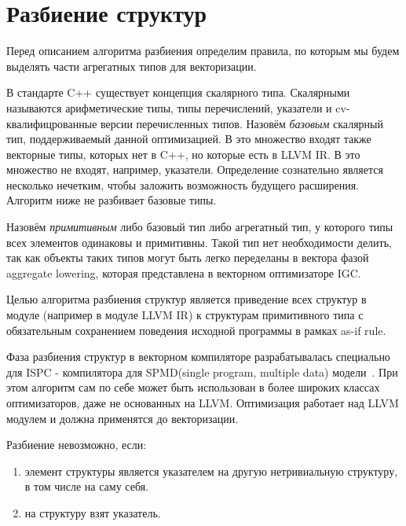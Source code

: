 \section{Разбиение структур}
\label{sec:Background}

Перед описанием алгоритма разбиения определим правила, по которым мы будем выделять части агрегатных типов для векторизации.

В стандарте C++ существует концепция скалярного типа.
Скалярными называются арифметические типы, типы перечислений, указатели и cv-квалифицрованные версии перечисленных типов.
Назовём \emph{базовым} скалярный тип, поддерживаемый данной оптимизацией.
В это множество входят также векторные типы, которых нет в C++, но которые есть в LLVM IR. 
В это множество не входят, например, указатели.
Определение сознательно является несколько нечетким, чтобы заложить возможность будущего расширения.
Алгоритм ниже не разбивает базовые типы.

Назовём \emph{примитивным} либо базовый тип либо агрегатный тип, у которого типы всех элементов одинаковы и примитивны.
Такой тип нет необходимости делить, так как объекты таких типов могут быть легко переделаны в вектора фазой aggregate lowering, которая представлена в векторном оптимизаторе IGC.


Целью алгоритма разбиения структур является приведение всех структур в модуле (например в модуле LLVM IR) к структурам примитивного типа с обязательным сохранением поведения исходной программы в рамках as-if rule.

Фаза разбиения структур в векторном компиляторе разрабатывалась специально для ISPC - компилятора для SPMD(single program, multiple data) модели~\cite{ISPC}.
При этом алгоритм сам по себе может быть использован в более широких классах оптимизаторов, даже не основанных на LLVM.
Оптимизация работает над LLVM модулем и должна применятся до векторизации.

Разбиение невозможно, если:
\begin{enumerate}
\item элемент структуры является указателем на другую нетривиальную структуру, в том числе на саму себя.
\item на структуру взят указатель.
\end{enumerate}

